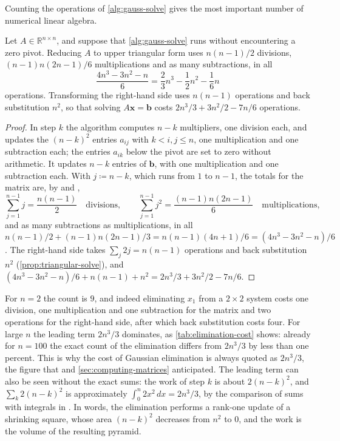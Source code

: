 Counting the operations of \cref{alg:gauss-solve} gives the most important number of numerical linear algebra.

\begin{proposition}
\label{prop:elimination-cost}
Let $A\in\mathbb R^{n\times n}$, and suppose that \cref{alg:gauss-solve} runs without encountering a zero pivot. Reducing $A$ to upper triangular form uses $n(n-1)/2$ divisions, $(n-1)n(2n-1)/6$ multiplications and as many subtractions, in all
\[
\frac{4n^3-3n^2-n}6=\frac23n^3-\frac12n^2-\frac16n
\]
operations. Transforming the right-hand side uses $n(n-1)$ operations and back substitution $n^2$, so that solving $A\mathbf x=\mathbf b$ costs $2n^3/3+3n^2/2-7n/6$ operations.
\end{proposition}

\begin{proof}
In step $k$ the algorithm computes $n-k$ multipliers, one division each, and updates the $(n-k)^2$ entries $a_{ij}$ with $k<i,j\le n$, one multiplication and one subtraction each; the entries $a_{ik}$ below the pivot are set to zero without arithmetic. It updates $n-k$ entries of $\mathbf b$, with one multiplication and one subtraction each. With $j\coloneqq n-k$, which runs from $1$ to $n-1$, the totals for the matrix are, by  and ,
\[
\sum_{j=1}^{n-1}j=\frac{n(n-1)}2\quad\text{divisions},\qquad\sum_{j=1}^{n-1}j^2=\frac{(n-1)n(2n-1)}6\quad\text{multiplications},
\]
and as many subtractions as multiplications,
in all $n(n-1)/2+(n-1)n(2n-1)/3=n(n-1)(4n+1)/6=(4n^3-3n^2-n)/6$. The right-hand side takes $\sum_j2j=n(n-1)$ operations and back substitution $n^2$ (\cref{prop:triangular-solve}), and $(4n^3-3n^2-n)/6+n(n-1)+n^2=2n^3/3+3n^2/2-7n/6$.
\end{proof}

For $n=2$ the count is $9$, and indeed eliminating $x_1$ from a $2\times2$ system costs one division, one multiplication and one subtraction for the matrix and two operations for the right-hand side, after which back substitution costs four. For large $n$ the leading term $2n^3/3$ dominates, as \cref{tab:elimination-cost} shows: already for $n=100$ the exact count of the elimination differs from $2n^3/3$ by less than one percent. This is why the cost of Gaussian elimination is always quoted as $2n^3/3$, the figure that  and \cref{sec:computing-matrices} anticipated. The leading term can also be seen without the exact sums: the work of step $k$ is about $2(n-k)^2$, and $\sum_k2(n-k)^2$ is approximately $\int_0^n2x^2\,dx=2n^3/3$, by the comparison of sums with integrals in . In words, the elimination performs a rank-one update of a shrinking square, whose area $(n-k)^2$ decreases from $n^2$ to $0$, and the work is the volume of the resulting pyramid.

